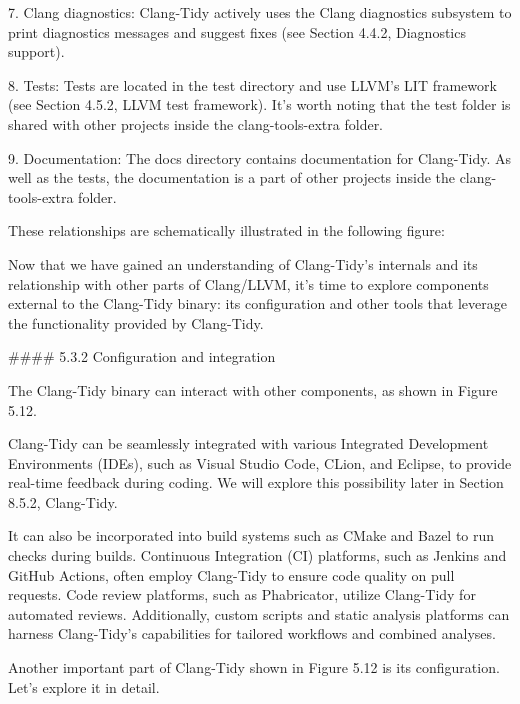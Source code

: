 \begin{markdown}
7. Clang diagnostics: Clang-Tidy actively uses the Clang diagnostics subsystem to print diagnostics messages and suggest fixes (see Section 4.4.2, Diagnostics support).

8. Tests: Tests are located in the test directory and use LLVM's LIT framework (see Section 4.5.2, LLVM test framework). It's worth noting that the test folder is shared with other projects inside the clang-tools-extra folder.

9. Documentation: The docs directory contains documentation for Clang-Tidy. As well as the tests, the documentation is a part of other projects inside the clang-tools-extra folder.

These relationships are schematically illustrated in the following figure:


Now that we have gained an understanding of Clang-Tidy's internals and its relationship with other parts of Clang/LLVM, it's time to explore components external to the Clang-Tidy binary: its configuration and other tools that leverage the functionality provided by Clang-Tidy.

#### 5.3.2 Configuration and integration

The Clang-Tidy binary can interact with other components, as shown in Figure 5.12.


Clang-Tidy can be seamlessly integrated with various Integrated Development Environments (IDEs), such as Visual Studio Code, CLion, and Eclipse, to provide real-time feedback during coding. We will explore this possibility later in Section 8.5.2, Clang-Tidy.

It can also be incorporated into build systems such as CMake and Bazel to run checks during builds. Continuous Integration (CI) platforms, such as Jenkins and GitHub Actions, often employ Clang-Tidy to ensure code quality on pull requests. Code review platforms, such as Phabricator, utilize Clang-Tidy for automated reviews. Additionally, custom scripts and static analysis platforms can harness Clang-Tidy's capabilities for tailored workflows and combined analyses.

Another important part of Clang-Tidy shown in Figure 5.12 is its configuration. Let's explore it in detail.


\end{markdown}
